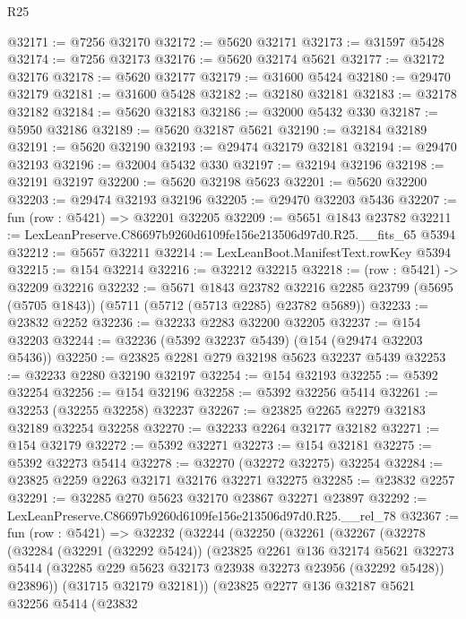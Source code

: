 \begin{lexlean}{R25}
\begin{coremodule}
@32171 := @7256 @32170
@32172 := @5620 @32171
@32173 := @31597 @5428
@32174 := @7256 @32173
@32176 := @5620 @32174 @5621
@32177 := @32172 @32176
@32178 := @5620 @32177
@32179 := @31600 @5424
@32180 := @29470 @32179
@32181 := @31600 @5428
@32182 := @32180 @32181
@32183 := @32178 @32182
@32184 := @5620 @32183
@32186 := @32000 @5432 @330
@32187 := @5950 @32186
@32189 := @5620 @32187 @5621
@32190 := @32184 @32189
@32191 := @5620 @32190
@32193 := @29474 @32179 @32181
@32194 := @29470 @32193
@32196 := @32004 @5432 @330
@32197 := @32194 @32196
@32198 := @32191 @32197
@32200 := @5620 @32198 @5623
@32201 := @5620 @32200
@32203 := @29474 @32193 @32196
@32205 := @29470 @32203 @5436
@32207 := fun (row : @5421) => @32201 @32205
@32209 := @5651 @1843 @23782
@32211 := LexLeanPreserve.C86697b9260d6109fe156e213506d97d0.R25.__fits_65 @5394
@32212 := @5657 @32211
@32214 := LexLeanBoot.ManifestText.rowKey @5394
@32215 := @154 @32214
@32216 := @32212 @32215
@32218 := (row : @5421) -> @32209 @32216
@32232 := @5671
    @1843
    @23782
    @32216
    @2285
    @23799
    (@5695 (@5705 @1843))
    (@5711 (@5712 (@5713 @2285) @23782 @5689))
@32233 := @23832 @2252
@32236 := @32233 @2283 @32200 @32205
@32237 := @154 @32203
@32244 := @32236 (@5392 @32237 @5439) (@154 (@29474 @32203 @5436))
@32250 := @23825 @2281 @279 @32198 @5623 @32237 @5439
@32253 := @32233 @2280 @32190 @32197
@32254 := @154 @32193
@32255 := @5392 @32254
@32256 := @154 @32196
@32258 := @5392 @32256 @5414
@32261 := @32253 (@32255 @32258) @32237
@32267 := @23825 @2265 @2279 @32183 @32189 @32254 @32258
@32270 := @32233 @2264 @32177 @32182
@32271 := @154 @32179
@32272 := @5392 @32271
@32273 := @154 @32181
@32275 := @5392 @32273 @5414
@32278 := @32270 (@32272 @32275) @32254
@32284 := @23825 @2259 @2263 @32171 @32176 @32271 @32275
@32285 := @23832 @2257
@32291 := @32285 @270 @5623 @32170 @23867 @32271 @23897
@32292 := LexLeanPreserve.C86697b9260d6109fe156e213506d97d0.R25.__rel_78
@32367 := fun (row : @5421) =>
  @32232
    (@32244
      (@32250
        (@32261
          (@32267
            (@32278
              (@32284
                (@32291 (@32292 @5424))
                (@23825
                  @2261
                  @136
                  @32174
                  @5621
                  @32273
                  @5414
                  (@32285 @229 @5623 @32173 @23938 @32273 @23956 (@32292 @5428))
                  @23896))
              (@31715 @32179 @32181))
            (@23825
              @2277
              @136
              @32187
              @5621
              @32256
              @5414
              (@23832

\end{coremodule}
\end{lexlean}
